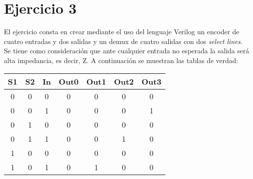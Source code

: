 \newpage
\section{Ejercicio 3}
\noindent
El ejercicio consta en crear mediante el uso del lenguaje Verilog un encoder de cuatro entradas y dos salidas y un demux de cuatro salidas con dos \textit{select lines}.\newline
Se tiene como consideración que ante cualquier entrada no esperada la salida será alta impedancia, es decir, Z.\newline
A continuaci\'on se muestran las tablas de verdad:

\begin{table}[H]
    \center
    \begin{tabular}{|ccc|cccc|}
    \hline
    \textbf{S1} & \textbf{S2} & \textbf{In} & \textbf{Out0} & \textbf{Out1} & \textbf{Out2} & \textbf{Out3} \\ \hline
    \cellcolor[HTML]{34FF34}0           & \cellcolor[HTML]{34FF34}0           & \cellcolor[HTML]{34FF34}0           & \cellcolor[HTML]{FD6864}0             & \cellcolor[HTML]{FD6864}0             & \cellcolor[HTML]{FD6864}0             & \cellcolor[HTML]{FD6864}0             \\
    \cellcolor[HTML]{34FF34}0           & \cellcolor[HTML]{34FF34}0           & \cellcolor[HTML]{34FF34}1           & \cellcolor[HTML]{FD6864}0             & \cellcolor[HTML]{FD6864}0             & \cellcolor[HTML]{FD6864}0             & \cellcolor[HTML]{FD6864}1             \\
    \cellcolor[HTML]{34FF34}0           & \cellcolor[HTML]{34FF34}1           & \cellcolor[HTML]{34FF34}0           & \cellcolor[HTML]{FD6864}0             & \cellcolor[HTML]{FD6864}0             & \cellcolor[HTML]{FD6864}0             & \cellcolor[HTML]{FD6864}0             \\
    \cellcolor[HTML]{34FF34}0           & \cellcolor[HTML]{34FF34}1           & \cellcolor[HTML]{34FF34}1           & \cellcolor[HTML]{FD6864}0             & \cellcolor[HTML]{FD6864}0             & \cellcolor[HTML]{FD6864}1             & \cellcolor[HTML]{FD6864}0             \\
    \cellcolor[HTML]{34FF34}1           & \cellcolor[HTML]{34FF34}0           & \cellcolor[HTML]{34FF34}0           & \cellcolor[HTML]{FD6864}0             & \cellcolor[HTML]{FD6864}0             & \cellcolor[HTML]{FD6864}0             & \cellcolor[HTML]{FD6864}0             \\
    \cellcolor[HTML]{34FF34}1           & \cellcolor[HTML]{34FF34}0           & \cellcolor[HTML]{34FF34}1           & \cellcolor[HTML]{FD6864}0             & \cellcolor[HTML]{FD6864}1             & \cellcolor[HTML]{FD6864}0             & \cellcolor[HTML]{FD6864}0             \\

\end{tabular}
\end{table}
